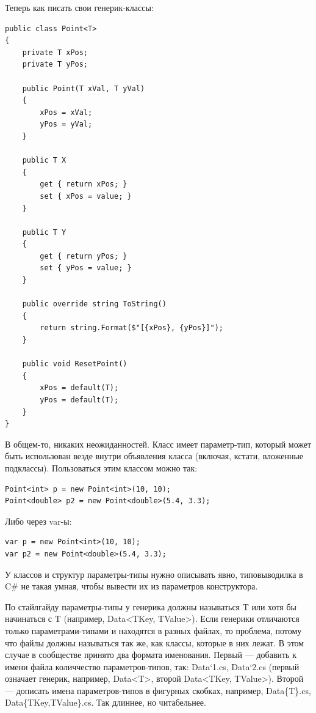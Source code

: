 \documentclass[a5paper]{article}
\begin{document}
Теперь как писать свои генерик-классы:

\begin{verbatim}
public class Point<T>
{
    private T xPos;
    private T yPos;

    public Point(T xVal, T yVal)
    {
        xPos = xVal;
        yPos = yVal;
    }

    public T X
    {
        get { return xPos; }
        set { xPos = value; }
    }

    public T Y
    {
        get { return yPos; }
        set { yPos = value; }
    }

    public override string ToString()
    {
        return string.Format($"[{xPos}, {yPos}]");
    }

    public void ResetPoint()
    {
        xPos = default(T);
        yPos = default(T);
    }
}
\end{verbatim}

В общем-то, никаких неожиданностей. Класс имеет параметр-тип, который может быть использован везде внутри объявления класса (включая, кстати, вложенные подклассы). Пользоваться этим классом можно так:

\begin{verbatim}
Point<int> p = new Point<int>(10, 10);
Point<double> p2 = new Point<double>(5.4, 3.3);
\end{verbatim}

Либо через var-ы:

\begin{verbatim}
var p = new Point<int>(10, 10);
var p2 = new Point<double>(5.4, 3.3);
\end{verbatim}

У классов и структур параметры-типы нужно описывать явно, типовыводилка в C\# не такая умная, чтобы вывести их из параметров конструктора.

По стайлгайду параметры-типы у генерика должны называться T или хотя бы начинаться с T (например, Data<TKey, TValue>). Если генерики отличаются только параметрами-типами и находятся в разных файлах, то проблема, потому что файлы должны называться так же, как классы, которые в них лежат. В этом случае в сообществе принято два формата именования. Первый --- добавить к имени файла количчество параметров-типов, так: Data‘1.cs, Data‘2.cs (первый означает генерик, например, Data<T>, второй Data<TKey, TValue>). Второй --- дописать имена параметров-типов в фигурных скобках, например, Data\{T\}.cs, Data\{TKey,TValue\}.cs. Так длиннее, но читабельнее.
\end{document}
